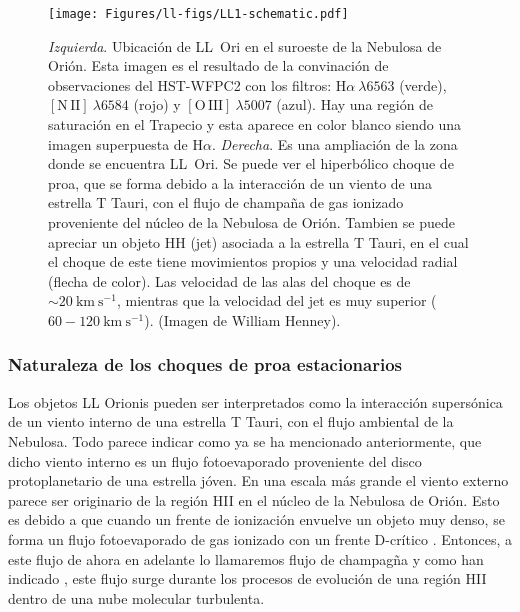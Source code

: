 \documentclass{article}
\newcommand\ha{\ensuremath{\mathrm{H}\alpha}}
\newcommand\nii{\ensuremath{\mathrm{[N\,II]}}}
\newcommand\oiii{\ensuremath{\mathrm{[O\,III]}}}
\begin{document}
\begin{figure}
  \centering
  \texttt{[image: Figures/ll-figs/LL1-schematic.pdf]}
  \caption{\textit{Izquierda}. Ubicación de LL~Ori en el suroeste de la Nebulosa de Orión. Esta imagen es el resultado de la convinación de observaciones del HST-WFPC2 \citep{Odell:1996} con los filtros: \(\ha~\lambda6563\) (verde), \(\nii~\lambda6584\) (rojo) y \(\oiii~\lambda5007\) (azul). Hay una región de saturación en el Trapecio y esta aparece en color blanco siendo una imagen superpuesta de \(\ha\). \textit{Derecha}. Es una ampliación de la zona donde se encuentra LL~Ori. Se puede ver el hiperbólico choque de proa, que se forma debido a la interacción de un viento de una estrella T Tauri, con  el flujo de champaña de gas ionizado  proveniente del núcleo de la Nebulosa de Orión. Tambien se puede apreciar un objeto HH (jet) asociada a la  estrella T Tauri, en  el cual el choque de este tiene movimientos propios \citep{Henney:2013a} y una velocidad radial (flecha de color). Las velocidad de las alas del choque es de \(\sim 20 ~\text{km}~\text{s}^{-1}\), mientras que la velocidad del jet es muy superior (\(60-120 ~\text{km}~\text{s}^{-1}\)). (Imagen de William Henney). }
  \label{fig:LL1}
\end{figure}

\subsubsection{Naturaleza de los choques de proa estacionarios }
\label{sec:choques}

Los objetos LL Orionis pueden ser interpretados como la interacción supersónica de un viento interno de una estrella T Tauri, con el flujo ambiental de la Nebulosa. Todo parece indicar como ya se ha mencionado anteriormente, que dicho viento interno es un flujo fotoevaporado proveniente del disco protoplanetario de una estrella jóven. En una escala más grande el viento externo parece ser originario de la  región HII en el núcleo de la Nebulosa de Orión. Esto es debido a que cuando un frente de ionización envuelve un objeto muy denso, se forma un flujo fotoevaporado de gas ionizado con un frente D-crítico \citep{Dyson:1968}. Entonces, a este flujo de ahora en adelante lo llamaremos flujo de champagña y como han indicado \citet{Mellema:2006, Arthur:2011, Ercolano:2012}, este flujo surge durante los procesos de evolución de una región HII dentro de una nube molecular turbulenta.\\
\end{document}
